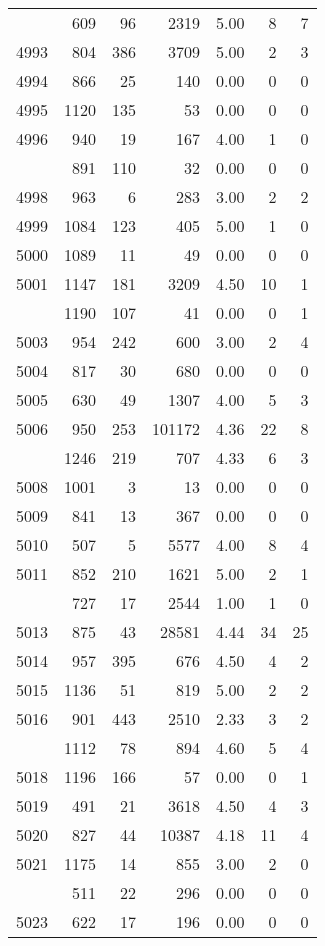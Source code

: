 \documentclass[
]{article}
\begin{document}
\begin{table}
\begin{tabular}[t]{lrrrrrr}
\addlinespace
4992 & 609 & 96 & 2319 & 5.00 & 8 & 7\\
4993 & 804 & 386 & 3709 & 5.00 & 2 & 3\\
4994 & 866 & 25 & 140 & 0.00 & 0 & 0\\
4995 & 1120 & 135 & 53 & 0.00 & 0 & 0\\
4996 & 940 & 19 & 167 & 4.00 & 1 & 0\\
\addlinespace
4997 & 891 & 110 & 32 & 0.00 & 0 & 0\\
4998 & 963 & 6 & 283 & 3.00 & 2 & 2\\
4999 & 1084 & 123 & 405 & 5.00 & 1 & 0\\
5000 & 1089 & 11 & 49 & 0.00 & 0 & 0\\
5001 & 1147 & 181 & 3209 & 4.50 & 10 & 1\\
\addlinespace
5002 & 1190 & 107 & 41 & 0.00 & 0 & 1\\
5003 & 954 & 242 & 600 & 3.00 & 2 & 4\\
5004 & 817 & 30 & 680 & 0.00 & 0 & 0\\
5005 & 630 & 49 & 1307 & 4.00 & 5 & 3\\
5006 & 950 & 253 & 101172 & 4.36 & 22 & 8\\
\addlinespace
5007 & 1246 & 219 & 707 & 4.33 & 6 & 3\\
5008 & 1001 & 3 & 13 & 0.00 & 0 & 0\\
5009 & 841 & 13 & 367 & 0.00 & 0 & 0\\
5010 & 507 & 5 & 5577 & 4.00 & 8 & 4\\
5011 & 852 & 210 & 1621 & 5.00 & 2 & 1\\
\addlinespace
5012 & 727 & 17 & 2544 & 1.00 & 1 & 0\\
5013 & 875 & 43 & 28581 & 4.44 & 34 & 25\\
5014 & 957 & 395 & 676 & 4.50 & 4 & 2\\
5015 & 1136 & 51 & 819 & 5.00 & 2 & 2\\
5016 & 901 & 443 & 2510 & 2.33 & 3 & 2\\
\addlinespace
5017 & 1112 & 78 & 894 & 4.60 & 5 & 4\\
5018 & 1196 & 166 & 57 & 0.00 & 0 & 1\\
5019 & 491 & 21 & 3618 & 4.50 & 4 & 3\\
5020 & 827 & 44 & 10387 & 4.18 & 11 & 4\\
5021 & 1175 & 14 & 855 & 3.00 & 2 & 0\\
\addlinespace
5022 & 511 & 22 & 296 & 0.00 & 0 & 0\\
5023 & 622 & 17 & 196 & 0.00 & 0 & 0\\

\end{tabular}
\end{table}
\end{document}
